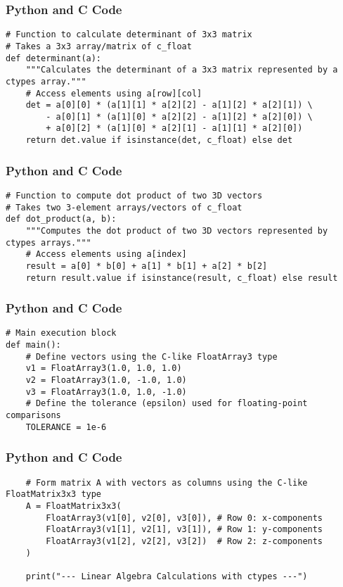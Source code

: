 \documentclass{beamer}
\begin{document}
\begin{frame}[fragile]
\frametitle{Python and C Code}
\begin{lstlisting}
# Function to calculate determinant of 3x3 matrix
# Takes a 3x3 array/matrix of c_float
def determinant(a):
    """Calculates the determinant of a 3x3 matrix represented by a ctypes array."""
    # Access elements using a[row][col]
    det = a[0][0] * (a[1][1] * a[2][2] - a[1][2] * a[2][1]) \
        - a[0][1] * (a[1][0] * a[2][2] - a[1][2] * a[2][0]) \
        + a[0][2] * (a[1][0] * a[2][1] - a[1][1] * a[2][0])
    return det.value if isinstance(det, c_float) else det
\end{lstlisting}
\end{frame}

\begin{frame}[fragile]
\frametitle{Python and C Code}
\begin{lstlisting}
# Function to compute dot product of two 3D vectors
# Takes two 3-element arrays/vectors of c_float
def dot_product(a, b):
    """Computes the dot product of two 3D vectors represented by ctypes arrays."""
    # Access elements using a[index]
    result = a[0] * b[0] + a[1] * b[1] + a[2] * b[2]
    return result.value if isinstance(result, c_float) else result
\end{lstlisting}
\end{frame}

\begin{frame}[fragile]
\frametitle{Python and C Code}
\begin{lstlisting}
# Main execution block
def main():
    # Define vectors using the C-like FloatArray3 type
    v1 = FloatArray3(1.0, 1.0, 1.0)
    v2 = FloatArray3(1.0, -1.0, 1.0)
    v3 = FloatArray3(1.0, 1.0, -1.0)
    # Define the tolerance (epsilon) used for floating-point comparisons
    TOLERANCE = 1e-6
\end{lstlisting}
\end{frame}

\begin{frame}[fragile]
\frametitle{Python and C Code}
\begin{lstlisting}  
    # Form matrix A with vectors as columns using the C-like FloatMatrix3x3 type
    A = FloatMatrix3x3(
        FloatArray3(v1[0], v2[0], v3[0]), # Row 0: x-components
        FloatArray3(v1[1], v2[1], v3[1]), # Row 1: y-components
        FloatArray3(v1[2], v2[2], v3[2])  # Row 2: z-components
    )

    print("--- Linear Algebra Calculations with ctypes ---")
\end{lstlisting}
\end{frame}
\end{document}
